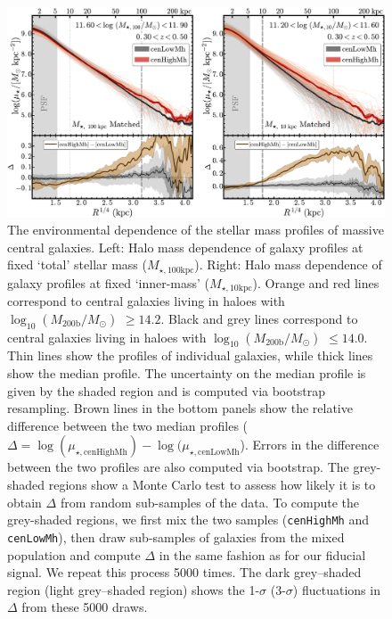 \documentclass[a4paper,fleqn,usenatbib]{mnras}
\def\rbcg{\texttt{cenHighMh}}
\def\nbcg{\texttt{cenLowMh}}
\def\logmh{{$\log_{10} (M_{\mathrm{200b}}/M_{\odot})$}}
\def\minn{{$M_{\star,10\mathrm{kpc}}$}}
\def\mtot{{$M_{\star,100\mathrm{kpc}}$}}
\begin{document}
  \begin{figure}
      \centering 
      \includegraphics[width=\textwidth]{fig/redbcg_prof_1}
      \caption{
          The environmental dependence of the stellar mass profiles of massive central 
          galaxies. 
          Left: Halo mass dependence of galaxy profiles at fixed `total' stellar mass 
          (\mtot{}). 
          Right: Halo mass dependence of galaxy profiles at fixed `inner-mass' 
          (\minn{}). Orange and red lines correspond to central galaxies living in 
          haloes with \logmh{} $\geq 14.2$. 
          Black and grey lines correspond to central galaxies living in haloes with 
          \logmh{} $\leq 14.0$. 
          Thin lines show the profiles of individual galaxies, while thick lines show 
          the median profile. 
          The uncertainty on the median profile is given by the shaded region and is 
          computed via bootstrap resampling. 
          Brown lines in the bottom panels show the relative difference between  
          the two median profiles 
          ($\Delta = \log(\mu_{\star, \mathrm{cenHighMh}}) - 
          \log(\mu_{\star, \mathrm{cenLowMh}}$). 
          Errors in the difference between the two profiles are also computed 
          via bootstrap.
          The grey-shaded regions show a Monte Carlo test to assess how likely it is to 
          obtain $\Delta$ from random sub-samples of the data. 
          To compute the grey-shaded regions, we first mix the two samples 
          (\rbcg{} and \nbcg{}), then draw sub-samples of galaxies from the mixed 
          population and compute $\Delta$ in the same fashion as for our fiducial 
          signal. 
          We repeat this process 5000 times.  
          The dark grey--shaded region (light grey--shaded region) shows the 1-$\sigma$ 
          (3-$\sigma$) fluctuations in $\Delta$ from these 5000 draws.
          }
      \label{fig:prof_1} 
  \end{figure}
\end{document}
